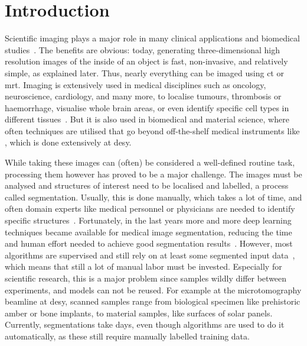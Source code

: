 \clearpage
\section{Introduction}\label{sec:introduction}
Scientific imaging plays a major role in many clinical applications and biomedical studies~\autocite{Ganguly2010}.
The benefits are obvious: today, generating three-dimensional high resolution images of the inside of an object is fast, non-invasive, and relatively simple, as explained later.
Thus, nearly everything can be imaged using \gls{ct} or \gls{mrt}.
Imaging is extensively used in medical disciplines such as oncology, neuroscience, cardiology, and many more, to localise tumours, thrombosis or haemorrhage, visualise whole brain areas, or even identify specific cell types in different tissues~\autocite{Ganguly2010}.
But it is also used in biomedical and material science, where often techniques are utilised that go beyond off-the-shelf medical instruments like , which is done extensively at \gls{desy}. %

While taking these images can (often) be considered a well-defined routine task, processing them however has proved to be a major challenge.
The images must be analysed and structures of interest need to be localised and labelled, a process called segmentation.
Usually, this is done manually, which takes a lot of time, and often domain experts like medical personnel or physicians are needed to identify specific structures~\autocite{Litjens2017}.
Fortunately, in the last years more and more deep learning techniques became available for medical image segmentation, reducing the time and human effort needed to achieve good segmentation results~\autocite{Antonelli2022}.
However, most algorithms are supervised and still rely on at least some segmented input data~\autocite[e.g.][]{Antonelli2022}, which means that still a lot of manual labor must be invested.
Especially for scientific research, this is a major problem since samples wildly differ between experiments, and models can not be reused.
For example at the microtomography beamline at \gls{desy}, scanned samples range from biological specimen like prehistoric amber or bone implants, to material samples, like surfaces of solar panels.
Currently, segmentations take days, even though algorithms are used to do it automatically, as these still require manually labelled training data.

